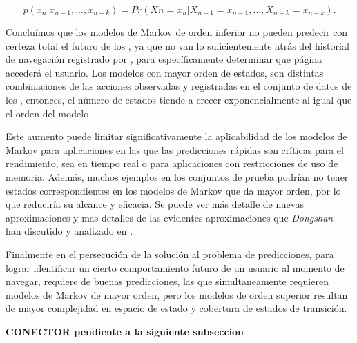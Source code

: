 \begin{equation}\label{eq:tantito}
p( x_{n} | x_{n-1},..., x_{n-k} ) = Pr(X{n} = x_{n}| X_{n-1} = x_{n-1},..., X_{n-k} = x_{n-k}) .
\end{equation}

Concluímos que los modelos de Markov de orden inferior no pueden predecir con certeza total el futuro de los \webasccesslog, ya que no van lo suficientemente atrás del historial de navegación registrado por \webasccesslog, para específicamente determinar que página accederá el usuario. Los modelos con mayor orden de estados, son distintas combinaciones de las acciones observadas y registradas en el conjunto de datos de los \webasccesslog, entonces, el número de estados tiende a crecer exponencialmente al igual que el orden del modelo.

Este aumento puede limitar significativamente la aplicabilidad de los modelos de Markov para aplicaciones en las que las predicciones rápidas son críticas para el rendimiento, sea en tiempo real o para aplicaciones con restricciones de uso de memoria. Además, muchos ejemplos en los conjuntos de prueba podrían no tener estados correspondientes en los modelos de Markov que da mayor orden, por lo que reduciría su alcance y eficacia. Se puede ver más detalle de nuevas aproximaciones y mas detalles de las evidentes aproximaciones que \emph{Dongshan~\etal}  han discutido y analizado en \cite{Dongshan2002}.

Finalmente en el persecución de la solución al problema de predicciones, para lograr identificar un cierto comportamiento futuro de un usuario al momento de navegar, requiere de buenas predicciones, las que simultaneamente requieren modelos de Markov de mayor orden, pero los modelos de orden superior resultan de mayor complejidad en espacio de estado y cobertura de estados de transición. 









\textbf{CONECTOR pendiente a la siguiente subseccion}